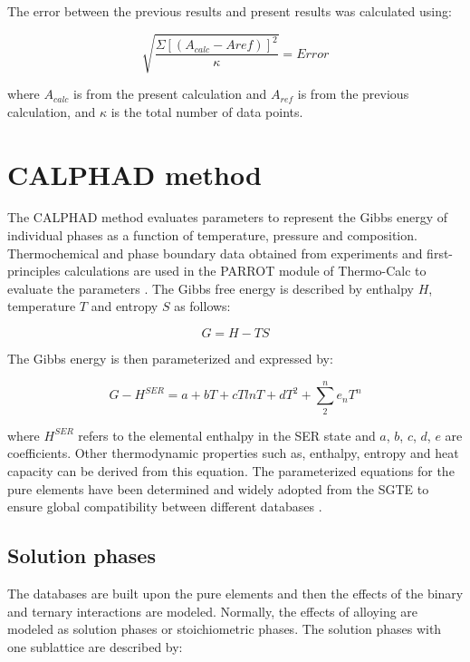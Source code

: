 The error between the previous results and present results was calculated using:

\begin{equation}
\label{eq: error}
\sqrt{\frac{\Sigma[(A_{calc}-A{ref})]^{2}}{\kappa}} = Error
\end{equation}

\noindent where $A_{calc}$ is from the present calculation and $A_{ref}$ is from the previous calculation, and $\kappa$ is the total number of data points. 

\section{CALPHAD method}

The CALPHAD method evaluates parameters to represent the Gibbs energy of individual phases as a function of temperature, pressure and composition. Thermochemical and phase boundary data obtained from experiments and first-principles calculations are used in the PARROT module of Thermo-Calc to evaluate the parameters \cite{Andersson2002}. The Gibbs free energy is described by enthalpy $H$, temperature $T$ and entropy $S$ as follows:

\begin{equation}
\label{eq: gibbs}
G = H - T S 
\end{equation}

\noindent The Gibbs energy is then parameterized and expressed by:

\begin{equation}
\label{eq: parameterizaiton}
G - H^{SER} = a + bT + cT ln T + d T^2 + \sum_{2}^{n} e_{n} T^{n}
\end{equation}

\noindent where $H^{SER}$ refers to the elemental enthalpy in the SER state and $a$, $b$, $c$, $d$, $e$ are coefficients. Other thermodynamic properties such as, enthalpy, entropy and heat capacity can be derived from this equation. The parameterized equations for the pure elements have been determined and widely adopted from the SGTE to ensure global compatibility between different databases \cite{Dinsdale1991}.

\subsection{Solution phases}

The databases are built upon the pure elements and then the effects of the binary and ternary interactions are modeled. Normally, the effects of alloying are modeled as solution phases or stoichiometric phases. The solution phases with one sublattice are described by: 

